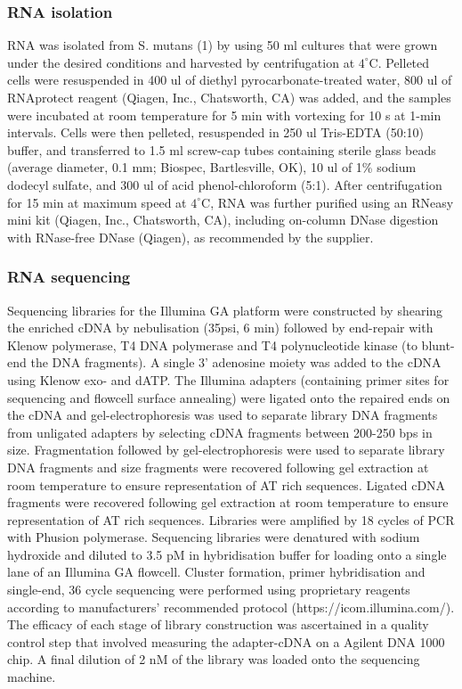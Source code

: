 \documentclass{article}
\begin{document}
\subsubsection{RNA isolation}
RNA was isolated from S. mutans (1) by using 50 ml cultures that were grown
under the desired conditions and harvested by centrifugation at $4^{\circ}$C. Pelleted
cells were resuspended in 400 ul of diethyl pyrocarbonate-treated water, 800 ul
of RNAprotect reagent (Qiagen, Inc., Chatsworth, CA) was added, and the samples
were incubated at room temperature for 5 min with vortexing for 10 s at 1-min
intervals. Cells were then pelleted, resuspended in 250 ul Tris-EDTA (50:10)
buffer, and transferred to 1.5 ml screw-cap tubes containing sterile glass beads
(average diameter, 0.1 mm; Biospec, Bartlesville, OK), 10 ul of 1\% sodium
dodecyl sulfate, and 300 ul of acid phenol-chloroform (5:1). After
centrifugation for 15 min at maximum speed at $4^{\circ}$C, RNA was further purified
using an RNeasy mini kit (Qiagen, Inc., Chatsworth, CA), including on-column
DNase digestion with RNase-free DNase (Qiagen), as recommended by the supplier.

\subsubsection{RNA sequencing}
Sequencing libraries for the Illumina GA platform were constructed by shearing
the enriched cDNA by nebulisation (35psi, 6 min) followed by end-repair with
Klenow polymerase, T4 DNA polymerase and T4 polynucleotide kinase (to blunt-end
the DNA fragments). A single 3' adenosine moiety was added to the cDNA using
Klenow exo- and dATP. The Illumina adapters (containing primer sites for
sequencing and flowcell surface annealing) were ligated onto the repaired ends
on the cDNA and gel-electrophoresis was used to separate library DNA fragments
from unligated adapters by selecting cDNA fragments between 200-250 bps in size.
Fragmentation followed by gel-electrophoresis were used to separate library DNA
fragments and size fragments were recovered following gel extraction at room
temperature to ensure representation of AT rich sequences. Ligated cDNA
fragments were recovered following gel extraction at room temperature to ensure
representation of AT rich sequences. Libraries were amplified by 18 cycles of
PCR with Phusion polymerase. Sequencing libraries were denatured with sodium
hydroxide and diluted to 3.5 pM in hybridisation buffer for loading onto a
single lane of an Illumina GA flowcell. Cluster formation, primer hybridisation
and single-end, 36 cycle sequencing were performed using proprietary reagents
according to manufacturers' recommended protocol (https://icom.illumina.com/).
The efficacy of each stage of library construction was ascertained in a quality
control step that involved measuring the adapter-cDNA on a Agilent DNA 1000
chip. A final dilution of 2 nM of the library was loaded onto the sequencing
machine.
\end{document}
